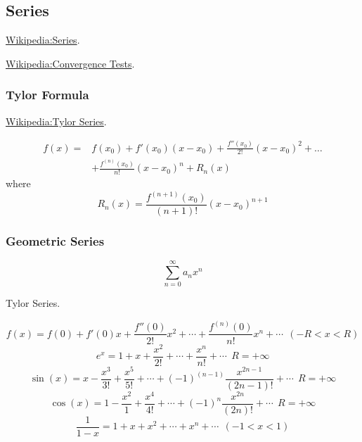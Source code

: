 %
%
%
%
%
%
%
%
%

  \subsection{Series}
\href{https://en.wikipedia.org/wiki/Series_(mathematics)}
{Wikipedia:Series}.

\href{https://en.wikipedia.org/wiki/Convergence_tests}
{Wikipedia:Convergence Tests}.

\subsubsection{Tylor Formula}

 \href{https://en.wikipedia.org/wiki/Taylor_series}
 {Wikipedia:Tylor Series}.

\begin{align*}
   f(x) =& f(x_0) + f'(x_0)(x-x_0) + \frac{f''(x_0)}{2!}(x-x_0)^2 + \ldots \\
   &+\frac{f^{(n)}(x_0)}{n!}(x-x_0)^n + R_n(x)
\end{align*}
where
$$ R_n(x) = \frac{f^{(n+1)}(x_0)}{(n+1)!}(x-x_0)^{n+1} $$


\subsubsection{Geometric Series}

$$ \sum_{n=0}^\infty a_n x^n $$

Tylor Series.

$$ f(x) = f(0) + f'(0)x + \frac{f''(0)}{2!} x^2 + \cdots + \frac{f^{(n)}(0)}{n!} x^n + \cdots ~~ (-R<x<R) $$
$$ e^x = 1 + x + \frac{x^2}{2!} + \cdots + \frac{x^n}{n!} + \cdots ~~ R=+\infty$$
$$ \sin(x) = x - \frac{x^3}{3!} + \frac{x^5}{5!} + \cdots + (-1)^{(n-1)} \frac{x^{2n-1}}{(2n-1)!} + \cdots ~~ R=+\infty$$
$$ \cos(x) = 1 - \frac{x^2}{1}  + \frac{x^4}{4!} + \cdots + (-1)^n \frac{x^{2n}}{(2n)!} + \cdots ~~ R=+\infty$$
$$ \frac{1}{1-x} = 1 + x + x^2 + \cdots + x^n + \cdots ~~ (-1<x<1)$$


